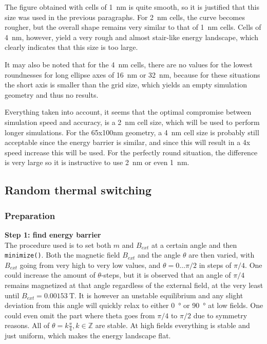 \documentclass[10pt,a4paper]{article}
\newcommand{\code}[1]{\texttt{#1}}
\begin{document}
The figure obtained with cells of \SI{1}{\nano\metre} is quite smooth, so it is justified that this size was used in the previous paragraphs. For \SI{2}{\nano\metre} cells, the curve becomes rougher, but the overall shape remains very similar to that of \SI{1}{\nano\metre} cells. Cells of \SI{4}{\nano\metre}, however, yield a very rough and almost stair-like energy landscape, which clearly indicates that this size is too large. \par
It may also be noted that for the \SI{4}{\nano\metre} cells, there are no values for the lowest roundnesses for long ellipse axes of \SI{16}{\nano\metre} or \SI{32}{\nano\metre}, because for these situations the short axis is smaller than the grid size, which yields an empty simulation geometry and thus no results. \par
Everything taken into account, it seems that the optimal compromise between simulation speed and accuracy, is a \SI{2}{\nano\metre} cell size, which will be used to perform longer simulations. For the 65x100nm geometry, a \SI{4}{\nano\metre} cell size is probably still acceptable since the energy barrier is similar, and since this will result in a 4x speed increase this will be used. For the perfectly round situation, the difference is very large so it is instructive to use \SI{2}{\nano\metre} or even \SI{1}{\nano\metre}.





\subsection{Random thermal switching}


\subsubsection{Preparation}
\textbf{Step 1: find energy barrier} \\
The procedure used is to set both $m$ and $B_{ext}$ at a certain angle and then \code{minimize()}. Both the magnetic field $B_{ext}$ and the angle $\theta$ are then varied, with $B_{ext}$ going from very high to very low values, and $\theta=0\dots\pi/2$ in steps of $\pi/4$. One could increase the amount of $\theta$-steps, but it is observed that an angle of $\pi/4$ remains magnetized at that angle regardless of the external field, at the very least until $B_{ext} = \SI{0.00153}{\tesla}$. It is however an unstable equilibrium and any slight deviation from this angle will quickly relax to either \SI{0}{\degree} or \SI{90}{\degree} at low fields.
One could even omit the part where theta goes from $\pi/4$ to $\pi/2$ due to symmetry reasons.
All of $\theta = k\frac{\pi}{4} , k\in\mathbb{Z}$ are stable.
At high fields everything is stable and just uniform, which makes the energy landscape flat.
\end{document}
